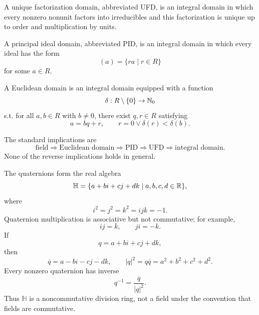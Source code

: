    \begin{definition}
        A unique factorization domain, abbreviated UFD, is an integral domain in
        which every nonzero nonunit factors into irreducibles and this
        factorization is unique up to order and multiplication by units.

        A principal ideal domain, abbreviated PID, is an integral domain in
        which every ideal has the form
        \[
            (a)=\{ra\mid r\in R\}
        \]
        for some $a\in R$.

        A Euclidean domain is an integral domain equipped with a function
        \[
            \delta:R\setminus\{0\}\to\mathbb{N}_0
        \]
        s.t. for all $a,b\in R$ with $b\neq0$, there exist $q,r\in R$
        satisfying
        \[
            a=bq+r,
            \qquad
            r=0\lor \delta(r)<\delta(b).
        \]
    \end{definition}

    \begin{theorem}
        The standard implications are
        \[
            \text{field}
            \Longrightarrow
            \text{Euclidean domain}
            \Longrightarrow
            \text{PID}
            \Longrightarrow
            \text{UFD}
            \Longrightarrow
            \text{integral domain}.
        \]
        None of the reverse implications holds in general.
    \end{theorem}

    \begin{definition}
        The quaternions form the real algebra
        \[
            \mathbb{H}
            =
            \{a+bi+cj+dk\mid a,b,c,d\in\mathbb{R}\},
        \]
        where
        \[
            i^2=j^2=k^2=ijk=-1.
        \]
        Quaternion multiplication is associative but not commutative; for
        example,
        \[
            ij=k,
            \qquad
            ji=-k.
        \]
        If
        \[
            q=a+bi+cj+dk,
        \]
        then
        \[
            \overline{q}=a-bi-cj-dk,
            \qquad
            |q|^2=q\overline{q}=a^2+b^2+c^2+d^2.
        \]
        Every nonzero quaternion has inverse
        \[
            q^{-1}=\frac{\overline{q}}{|q|^2}.
        \]
        Thus $\mathbb{H}$ is a noncommutative division ring, not a field under
        the convention that fields are commutative.
    \end{definition}

